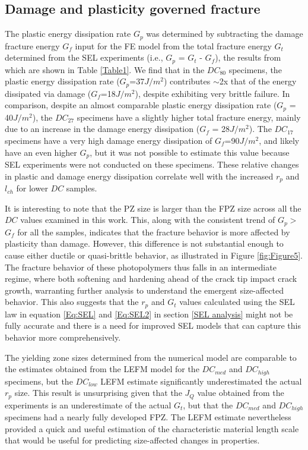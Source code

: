 \documentclass[11pt]{article}
\providecommand{\Jms}[0]{$J/m^2$}
\providecommand{\rp}[0]{$r_p$}
\providecommand{\lch}[0]{$l_{ch}$}
\providecommand{\DC}[0]{$DC$}
\providecommand{\DClow}[0]{$DC_{low}$}
\providecommand{\DCmed}[0]{$DC_{med}$}
\providecommand{\DChi}[0]{$DC_{high}$}
\providecommand{\DCi}[0]{$DC_{17}$}
\providecommand{\DCj}[0]{$DC_{27}$}
\providecommand{\DCk}[0]{$DC_{80}$}
\providecommand{\Gt}[0]{$G_{t}$}
\providecommand{\Gp}[0]{$G_{p}$}
\providecommand{\Gf}[0]{$G_{f}$}
\providecommand{\Jq}[0]{$J_{Q}$}
\begin{document}
        \subsection{Damage and plasticity governed fracture}
        The plastic energy dissipation rate \Gp{} was determined by subtracting the damage fracture energy \Gf{} input for the FE model from the total fracture energy \Gt{} determined from the SEL experiments (i.e., \Gp{} = \Gt{} - \Gf{}), the results from which are shown in Table \ref{Table1}.
        We find that in the \DCk{} specimens, the plastic energy dissipation rate (\Gp{}=37\Jms{}) contributes $\sim$2x that of the energy dissipated via damage (\Gf{}=18\Jms{}), despite exhibiting very brittle failure.
        In comparison, despite an almost comparable plastic energy dissipation rate (\Gp{} = 40\Jms{}), the \DCj{} specimens have a slightly higher total fracture energy, mainly due to an increase in the damage energy dissipation (\Gf{} = 28\Jms{}).
        The \DCi{} specimens have a very high damage energy dissipation of \Gf{}=90\Jms{}, and likely have an even higher \Gp{}, but it was not possible to estimate this value because SEL experiments were not conducted on these specimens.
        These relative changes in plastic and damage energy dissipation correlate well with the increased \rp{} and \lch{} for lower \DC{} samples.
        
        It is interesting to note that the PZ size is larger than the FPZ size across all the \DC{} values examined in this work.
        This, along with the consistent trend of \Gp{}$>$\Gf{} for all the samples, indicates that the fracture behavior is more affected by plasticity than damage.
        However, this difference is not substantial enough to cause either ductile or quasi-brittle behavior, as illustrated in Figure \ref{fig:Figure5}.
        The fracture behavior of these photopolymers thus falls in an intermediate regime, where both softening and hardening ahead of the crack tip impact crack growth, warranting further analysis to understand the emergent size-affected behavior.
        This also suggests that the \rp{} and \Gt{} values calculated using the SEL law in equation \ref{Eq:SEL} and \ref{Eq:SEL2} in section \ref{SEL analysis} might not be fully accurate and there is a need for improved SEL models that can capture this behavior more comprehensively. 
        
        The yielding zone sizes determined from the numerical model are comparable to the estimates obtained from the LEFM model for the \DCmed{} and \DChi{} specimens, but the \DClow{} LEFM estimate significantly underestimated the actual \rp{} size.
        This result is unsurprising given that the \Jq{} value obtained from the experiments is an underestimate of the actual \Gt{}, but that the \DCmed{} and \DChi{} specimens had a nearly fully developed FPZ.
        The LEFM estimate nevertheless provided a quick and useful estimation of the characteristic material length scale that would be useful for predicting size-affected changes in properties.
\end{document}
